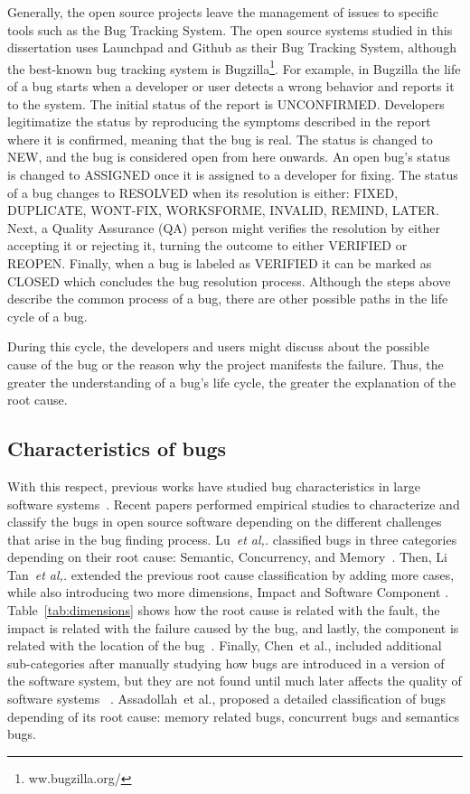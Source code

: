 \documentclass[a4paper, 12pt]{book}
\begin{document}
Generally, the open source projects leave the management of issues to specific tools such as the Bug Tracking System. The open source systems studied in this dissertation uses Launchpad and Github as their Bug Tracking System, although the best-known bug tracking system is Bugzilla\footnote{ww.bugzilla.org/}. For example, in Bugzilla the life of a bug starts when a developer or user detects a wrong behavior and reports it to the system. The initial status of the report is UNCONFIRMED. Developers legitimatize the status by reproducing the symptoms described in the report where it is confirmed, meaning that the bug is real. The status is changed to NEW, and the bug is considered open from here onwards. An open bug's status is changed to ASSIGNED once it is assigned to a developer for fixing. The status of a bug changes to RESOLVED when its resolution is either: FIXED, DUPLICATE, WONT-FIX, WORKSFORME, INVALID, REMIND, LATER. Next, a Quality Assurance (QA) person might verifies the resolution by either accepting it or rejecting it, turning the outcome to either VERIFIED or REOPEN. Finally, when a bug is labeled as VERIFIED it can be marked as CLOSED which concludes the bug resolution process. Although the steps above describe the common process of a bug, there are other possible paths in the life cycle of a bug.

During this cycle, the developers and users might discuss about the possible cause of the bug or the reason why the project manifests the failure. Thus, the greater the understanding of a bug's life cycle, the greater the explanation of the root cause.

\subsection{Characteristics of bugs}

With this respect, previous works have studied bug characteristics in large software systems~\cite{chou2001empirical,gu2003characterization,ostrand1984collecting,ostrand2002distribution,podgurski2003automated, sullivan1992comparison,chen2014empirical,li2006have,beizer2003software,tan2014bug}. Recent papers  performed empirical studies to characterize and classify the bugs in open source software depending on the different challenges that arise in the bug finding process. Lu~\emph{et al,.} classified bugs in three categories depending on their root cause: Semantic, Concurrency, and Memory~\cite{lu2005bugbench}. Then, Li Tan~\emph{et al,.} extended the previous root cause classification by adding more cases, while also introducing two more dimensions, Impact and Software Component \cite{tan2014bug}. Table~\ref{tab:dimensions} shows how the root cause is related with the fault, the impact is related with the failure caused by the bug, and lastly, the component is related with the location of the bug~\cite{li2006have}. Finally, Chen~{et al.,} included additional sub-categories after manually studying how bugs  are introduced in a version of the software system, but they are not found until much later affects the quality of software systems ~\cite{chen2014empirical}. Assadollah~{et al.,} proposed a detailed classification of bugs depending of its root cause: memory related bugs, concurrent bugs and semantics bugs.
\end{document}
